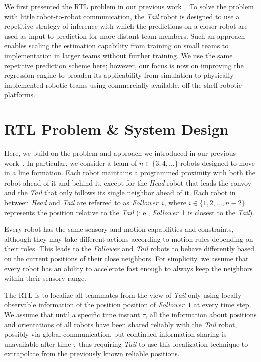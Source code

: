 \documentclass[letterpaper, 10 pt, conference]{ieeeconf}  %
\begin{document}
    We first presented the RTL problem in our previous
    work~\cite{CPR17}. To solve the problem with little robot-to-robot
    communication, the \emph{Tail} robot is designed to use a repetitive
    strategy of inference with which the predictions on a closer robot
    are used as input to prediction for more distant team members. Such
    an approach enables scaling the estimation capability from training
    on small teams to implementation in larger teams without further
    training. We use the same repetitive prediction scheme here;
    however, our focus is now on improving the regression engine to
    broaden its applicability from simulation to physically implemented
    robotic teams using commercially available, off-the-shelf robotic
    platforms.

	\section{RTL Problem \& System Design}
	\label{sec:rtl_problem}

    Here, we build on the problem and approach we introduced in our previous
    work~\cite{CPR17}. In particular, we consider a team of $n \in
    \{3,4,\dots\}$ robots designed to move in a line formation.
    Each robot maintains a programmed
    proximity with both the robot ahead of it and behind it, except for
    the \emph{Head} robot that leads the convoy and the \emph{Tail}
    that only follows its single neighbor ahead of it. Each robot in
    between \emph{Head} and \emph{Tail} are referred to as
    \emph{Follower}~$i$, where $i \in \{1, 2, \dots, n-2\}$ represents
    the position relative to the \emph{Tail} (i.e., \emph{Follower}~1 is
    closest to the \emph{Tail}).

    Every robot has the same sensory and motion capabilities and
    constraints, although they may take different actions according to
    motion rules depending on their roles. This leads to the
    \emph{Follower} and \emph{Tail} robots to behave differently based
    on the current positions of their close neighbors. For simplicity,
    we assume that every robot has an ability to accelerate fast enough
    to always keep the neighbors within their sensory range.

    The RTL is to localize all teammates from the view of \emph{Tail}
    only using locally observable information of the position position
    of \emph{Follower}~$1$ at every time step. We assume that until a
    specific time instant $\tau$, all the information about positions
    and orientations of all robots have been shared reliably with the
    \emph{Tail} robot, possibly via global communication, but continued
    information sharing is unavailable after time $\tau$ thus requiring
    \emph{Tail} to use this localization technique to extrapolate from
    the previously known reliable positions.
\end{document}
